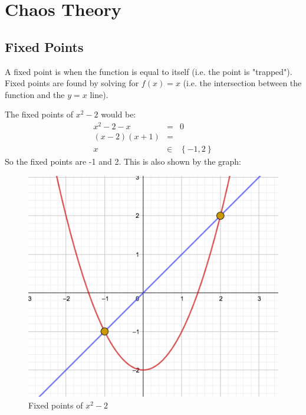 \documentclass{beamer}
\begin{document}
    \section{Chaos Theory}
    \subsection{Fixed Points}
    \begin{frame}
        A fixed point is when the function is equal to itself (i.e. the point is "trapped"). Fixed points are found by solving for $f(x)=x$ (i.e. the intersection between the function and the $y=x$ line).
    \end{frame}
    \begin{frame} 
        \begin{example}
            The fixed points of $x^2-2$ would be:
            \begin{eqnarray*}
                x^2 - 2 - x & = & 0 \\
                (x-2)(x+1) & = & \\
                x & \in & \left\{-1,2\right\}
            \end{eqnarray*}
            So the fixed points are -1 and 2. 
            This is also shown by the graph:
            \begin{figure}
                \centering
                \caption{Fixed points of $x^2-2$}
                \includegraphics[scale=.2]{images/fixed-points-1.png}
            \end{figure}
        \end{example} 
    \end{frame}
\end{document}
